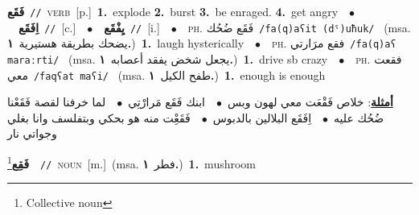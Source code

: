 \documentclass[10pt,a4paper,twoside]{article} %
\begin{document}
\begin{multicols}{2}
{\setlength\topsep{0pt}\textbf{\foreignlanguage{arabic}{فَقَع}}\ {\color{gray}\texttt{//}\color{black}}\ \textsc{verb}\ [p.]\ \textbf{1.}~explode  \textbf{2.}~burst  \textbf{3.}~be enraged.  \textbf{4.}~get angry\ \ $\bullet$\ \ \setlength\topsep{0pt}\textbf{\foreignlanguage{arabic}{اِفَقَع}}\ {\color{gray}\texttt{//}\color{black}}\ [c.]\ \ $\bullet$\ \ \setlength\topsep{0pt}\textbf{\foreignlanguage{arabic}{يِفْقَع}}\ {\color{gray}\texttt{//}\color{black}}\ [i.]\ \ $\bullet$\ \ \textsc{ph.} \color{gray} \foreignlanguage{arabic}{فَقَع ضُحُك}\color{black}\ {\color{gray}\texttt{/{\sffamily fa(q)aʕit (dˤ)uħuk}/}\color{black}}\ \color{gray} (msa. \foreignlanguage{arabic}{يضحك بطريقة هستيرية}~\foreignlanguage{arabic}{\textbf{١.}})\color{black}\ \textbf{1.}~laugh hysterically\ \ $\bullet$\ \ \textsc{ph.} \color{gray} \foreignlanguage{arabic}{فقع مرَارتي}\color{black}\ {\color{gray}\texttt{/{\sffamily fa(q)aʕ maraːrti}/}\color{black}}\ \color{gray} (msa. \foreignlanguage{arabic}{يجعل شخض يفقد أعصابه}~\foreignlanguage{arabic}{\textbf{١.}})\color{black}\ \textbf{1.}~drive sb crazy\ \ $\bullet$\ \ \textsc{ph.} \color{gray} \foreignlanguage{arabic}{فقعت معي}\color{black}\ {\color{gray}\texttt{/{\sffamily faqʕat maʕi}/}\color{black}}\ \color{gray} (msa. \foreignlanguage{arabic}{طفح الكيل}~\foreignlanguage{arabic}{\textbf{١.}})\color{black}\ \textbf{1.}~enough is enough\  \begin{flushright}\color{gray}\foreignlanguage{arabic}{\textbf{\underline{\foreignlanguage{arabic}{أمثلة}}}: خلاص فَقْعَت معي لهون وبس\ $\bullet$\ \  ابنك فَقَع مَرارْتِي\ $\bullet$\ \  لما خرفنا لقصة فَقَعْنا ضُحُك عليه\ $\bullet$\ \  اِفَقَع البلالين بالدبوس\ $\bullet$\ \  فَقَعِْت منه هو بحكي وبتفلسف وانا بغلي وجواتي نار}\end{flushright}\color{black}} \vspace{2mm}

{\setlength\topsep{0pt}\textbf{\foreignlanguage{arabic}{فَقِع}}\footnote{Collective noun}\ \ {\color{gray}\texttt{//}\color{black}}\ \textsc{noun}\ [m.]\ \color{gray}(msa. \foreignlanguage{arabic}{فطر}~\foreignlanguage{arabic}{\textbf{١.}})\color{black}\ \textbf{1.}~mushroom\ } \vspace{2mm}


\end{multicols}
\end{document}
